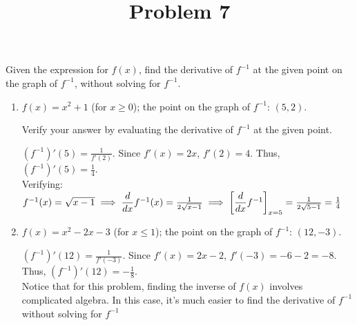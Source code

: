 \documentclass{ximera}
\title[Problem 7]{Problem 7}
\begin{document}
\begin{abstract} \end{abstract}
\maketitle


\begin{problem}
Given the expression for $f(x)$, find the derivative of $f^{-1}$ at the given point on the graph of $f^{-1}$,  without solving for $f^{-1}$.
	\begin{enumerate}
	
	\item  $f(x) = x^2 + 1$ (for $x \geq 0$);  the point  on the graph of $f^{-1}$: $(5,2)$. 
	
	 Verify your answer by evaluating the derivative of $f^{-1}$ at the given point.
\begin{explanation}
		$(f^{-1})'(5) = \frac{1}{f'(2)}$.  Since $f'(x) = 2x$, $f'(2) = 4$.  Thus, $(f^{-1})'(5) = \frac{1}{4}$. \\
		Verifying: $f^{-1}(x)=\sqrt{x-1} \implies \dfrac{d}{dx} f^{-1}(x)= \frac{1}{2\sqrt{x-1}} \implies \bigg[ \dfrac{d}{dx} f^{-1} \bigg]_{x=5}=\frac{1}{2\sqrt{5-1}}=\frac{1}{4}$ 
		
		
		\end{explanation}

	\item  $f(x) = x^2 - 2x - 3$ (for $x \leq 1$); the point  on the graph of $f^{-1}$: $(12, -3)$. 
\begin{explanation}
		$(f^{-1})'(12) = \frac{1}{f'(-3)}$.  Since $f'(x) = 2x - 2$, $f'(-3) = -6 - 2 = -8$.  Thus, $(f^{-1})'(12) = - \frac{1}{8}$. \\
		Notice that for this problem, finding the inverse of $f(x)$ involves complicated algebra.  In this case, it's much easier to find the derivative of $f^{-1}$ without solving for $f^{-1}$
		\end{explanation}
	\end{enumerate}
\end{problem}
\end{document}
